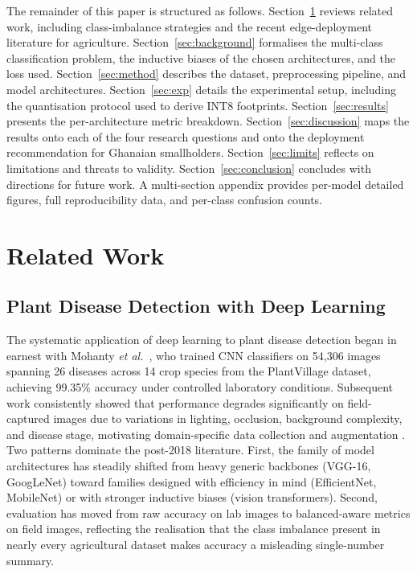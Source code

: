 \documentclass[conference,10pt]{IEEEtran}
\begin{document}
The remainder of this paper is structured as follows.
Section~\ref{sec:related} reviews related work, including class-imbalance
strategies and the recent edge-deployment literature for agriculture.
Section~\ref{sec:background} formalises the multi-class classification
problem, the inductive biases of the chosen architectures, and the loss used.
Section~\ref{sec:method} describes the dataset, preprocessing pipeline, and
model architectures.
Section~\ref{sec:exp} details the experimental setup, including the
quantisation protocol used to derive INT8 footprints.
Section~\ref{sec:results} presents the per-architecture metric breakdown.
Section~\ref{sec:discussion} maps the results onto each of the four research
questions and onto the deployment recommendation for Ghanaian smallholders.
Section~\ref{sec:limits} reflects on limitations and threats to validity.
Section~\ref{sec:conclusion} concludes with directions for future work.
A multi-section appendix provides per-model detailed figures, full
reproducibility data, and per-class confusion counts.

\section{Related Work}\label{sec:related}

\subsection{Plant Disease Detection with Deep Learning}

The systematic application of deep learning to plant disease detection began
in earnest with Mohanty \emph{et al.}~\cite{mohanty2016}, who trained CNN
classifiers on 54{,}306 images spanning 26 diseases across 14 crop species
from the PlantVillage dataset, achieving 99.35\% accuracy under controlled
laboratory conditions. Subsequent work consistently showed that performance
degrades significantly on field-captured images due to variations in
lighting, occlusion, background complexity, and disease stage, motivating
domain-specific data collection and augmentation \cite{alvarado2025}.
Two patterns dominate the post-2018 literature. First, the family of model
architectures has steadily shifted from heavy generic backbones (VGG-16,
GoogLeNet) toward families designed with efficiency in mind (EfficientNet,
MobileNet) or with stronger inductive biases (vision transformers).
Second, evaluation has moved from raw accuracy on lab images to
balanced-aware metrics on field images, reflecting the realisation that the
class imbalance present in nearly every agricultural dataset makes accuracy
a misleading single-number summary.
\end{document}
